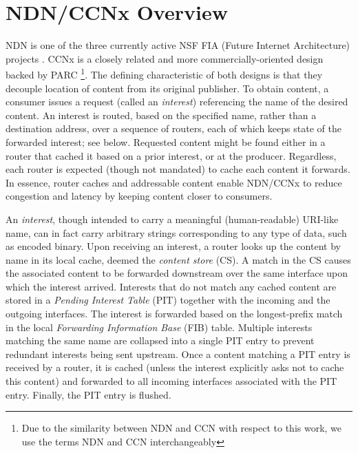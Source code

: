\section{NDN/CCNx Overview}
NDN is one of the three currently active NSF FIA (Future Internet Architecture) projects \cite{ndn-techreport}. CCNx is a closely related and more commercially-oriented design backed by PARC \cite{ccnx}\footnote{Due to the similarity between NDN and CCN with respect to this work, we use the terms NDN and CCN interchangeably}. The defining characteristic of both designs is that they decouple location of content from its original publisher. To obtain content, a consumer issues a request (called an {\em interest}) referencing the name of the desired content. An interest is routed, based on the specified name, rather than a destination address, over a sequence of routers, each of which keeps state of the forwarded interest; see below. Requested content might be found either in a router that cached it based on a prior interest, or at the producer. Regardless, each router is expected (though not mandated) to cache each content it forwards. In essence, router caches and addressable content enable NDN/CCNx to reduce congestion and latency by keeping content closer to consumers. 

An \emph{interest}, though intended to carry a meaningful (human-readable) URI-like name, can in fact carry arbitrary strings corresponding to any type of data, such as encoded binary. Upon receiving an interest, a router looks up the content by name in its local cache, deemed the \emph{content store} (CS). A match in the CS causes the associated content to be forwarded downstream over the same interface upon which the interest arrived. Interests that do not match any cached content are stored in a \emph{Pending Interest Table} (PIT) together with the incoming and the outgoing interfaces. The interest is forwarded based on the longest-prefix match in the local \emph{Forwarding Information Base} (FIB) table. Multiple interests matching the same name are collapsed into a single PIT entry to prevent redundant interests being sent upstream. Once a content matching a PIT entry is received by a router, it is cached (unless the interest explicitly asks not to cache this content) and forwarded to all incoming interfaces associated with the PIT entry. Finally, the PIT entry is flushed.

